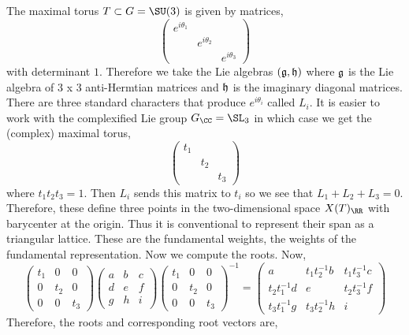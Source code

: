 \documentclass[12pt]{article}
\begin{document}
The maximal torus $T \subset G = \SU(3)$ is given by matrices,
\[ \begin{pmatrix}
e^{i \theta_1} 
\\
& e^{i \theta_2}
\\
& & e^{i \theta_3}
\end{pmatrix} \]
with determinant $1$. Therefore we take the Lie algebras $(\mathfrak{g}, \mathfrak{h})$ where $\mathfrak{g}$ is the Lie algebra of 3 x 3 anti-Hermtian matrices and $\mathfrak{h}$ is the imaginary diagonal matrices. 
\bigskip\\
There are three standard characters that produce $e^{i \theta_i}$ called $L_i$. It is easier to work with the complexified Lie group $G_{\CC} = \SL_3$ in which case we get the (complex) maximal torus,
\[ \begin{pmatrix}
t_1
\\
& t_2
\\
& & t_3
\end{pmatrix} \]
where $t_1 t_2 t_3 = 1$. Then $L_i$ sends this matrix to $t_i$ so we see that $L_1 + L_2 + L_3 = 0$. Therefore, these define three points in the two-dimensional space $X(T)_{\RR}$ with barycenter at the origin. Thus it is conventional to represent their span as a triangular lattice. These are the fundamental weights, the weights of the fundamental representation. Now we compute the roots. 
Now,
\[ 
\begin{pmatrix}
t_1 & 0 & 0
\\
0 & t_2 & 0
\\
0 & 0 & t_3
\end{pmatrix}
\begin{pmatrix}
a & b & c
\\
d & e & f
\\
g & h & i
\end{pmatrix}
\begin{pmatrix}
t_1 & 0 & 0
\\
0 & t_2 & 0
\\
0 & 0 & t_3
\end{pmatrix} ^{-1}
= 
\begin{pmatrix}
a & t_1 t_2^{-1} b & t_1 t_3^{-1} c
\\
t_2 t_1^{-1} d & e & t_2 t_3^{-1} f
\\
t_3 t_1^{-1} g & t_3 t_2^{-1} h & i
\end{pmatrix} \]
Therefore, the roots and corresponding root vectors are,
\end{document}
